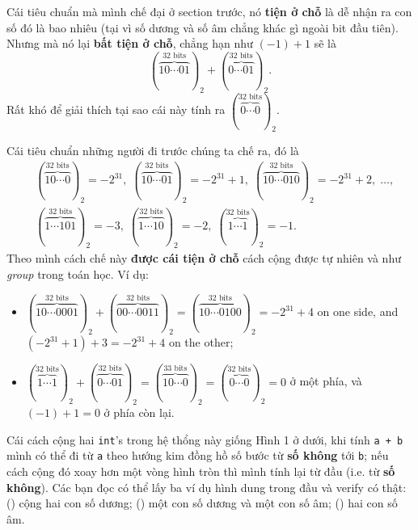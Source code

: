 \documentclass{article}
\begin{document}
Cái tiêu chuẩn mà mình chế đại ở section trước, nó \textbf{tiện ở chỗ} là dễ nhận ra con số đó là bao nhiêu (tại vì số dương và số âm chẳng khác gì ngoài bit đầu tiên). Nhưng mà nó lại \textbf{bất tiện ở chỗ}, chẳng hạn như $(-1) + 1$ sẽ là
$$(\overbrace{10\cdots01}^{\textrm{32 bits}})_{2} + (\overbrace{0\cdots01}^{\textrm{32 bits}})_{2}.$$
Rất khó để giải thích tại sao cái này tính ra $(\overbrace{0\cdots0}^{\textrm{32 bits}})_{2}$.

Cái tiêu chuẩn những người đi trước chúng ta chế ra, đó là
\begin{equation*}
\begin{split}
	&(\overbrace{10\cdots0}^{\textrm{32 bits}})_{2} = -2^{31},\;
 	 (\overbrace{10\cdots01}^{\textrm{32 bits}})_{2} = -2^{31} + 1,\;
	 (\overbrace{10\cdots010}^{\textrm{32 bits}})_{2} = -2^{31} + 2, \;\ldots, \\
	&(\overbrace{1\cdots101}^{\textrm{32 bits}})_{2} = -3,\;
	 (\overbrace{1\cdots10}^{\textrm{32 bits}})_{2} = -2,\;
	 (\overbrace{1\cdots1}^{\textrm{32 bits}})_{2} = -1.
\end{split}
\end{equation*}
Theo mình cách chế này \textbf{được cái tiện ở chỗ} cách cộng được tự nhiên và như \emph{group} trong toán học. Ví dụ:
\begin{itemize}
	\item $(\overbrace{10\cdots0001}^{\textrm{32 bits}})_{2} + (\overbrace{00\cdots0011}^{\textrm{32 bits}})_{2} = (\overbrace{10\cdots0100}^{\textrm{32 bits}})_{2} = -2^{31} + 4$ on one side, and $(-2^{31} + 1) + 3 = -2^{31} + 4$ on the other;
	\item $(\overbrace{1\cdots1}^{\textrm{32 bits}})_{2} + (\overbrace{0\cdots01}^{\textrm{32 bits}})_{2} = (\overbrace{10\cdots0}^{\textrm{33 bits}})_{2} = (\overbrace{0\cdots0}^{\textrm{32 bits}})_{2} = 0$ ở một phía, và $(-1) + 1 = 0$ ở phía còn lại.
\end{itemize}

Cái cách cộng hai \texttt{int}'s trong hệ thổng này giống Hình 1 ở dưới, khi tính \texttt{a + b} mình có thể đi từ \texttt{a} theo hướng kim đồng hồ số bước từ \textbf{số không} tới \texttt{b}; nếu cách cộng đó xoay hơn một vòng hình tròn thì mình tính lại từ đầu (i.e. từ \textbf{số không}). Các bạn đọc có thể lấy ba ví dụ hình dung trong đầu và verify có thật: () cộng hai con số dương; () một con số dương và một con số âm; () hai con số âm.
\end{document}
